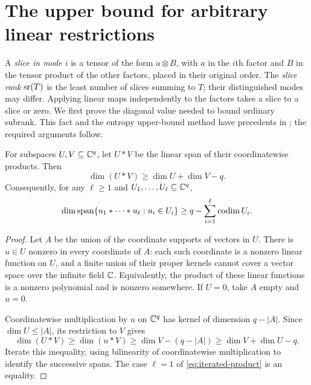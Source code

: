 \section{The upper bound for arbitrary linear restrictions}\label{sec:upper}

A \emph{slice in mode $i$} is a tensor of the form $a\otimes B$,
with $a$ in the $i$th factor and $B$ in the tensor product of the other
factors, placed in their original order. The \emph{slice rank} $\operatorname{sr}(T)$
is the least number of slices summing to $T$; their distinguished modes
may differ. Applying linear maps independently to the factors takes
a slice to a slice or zero. We first prove the diagonal value needed
to bound ordinary subrank. This fact and the entropy upper-bound method
have precedents in \citet{TaoSawin2016}; the required arguments follow.

\begin{lemma}\label{lem:product-dimension}
For subspaces $U,V\subseteq\mathbb C^q$, let $U*V$ be the linear span of
their coordinatewise products. Then
\begin{equation}\label{eq:product-dimension}
 \dim(U*V)\geq\dim U+\dim V-q.
\end{equation}
Consequently, for any $\ell\geq1$ and $U_1,\ldots,U_\ell\subseteq\mathbb C^q$,
\begin{equation}\label{eq:iterated-product}
 \dim\operatorname{span}\{u_1*\cdots*u_\ell:u_i\in U_i\}
    \geq q-\sum_{i=1}^{\ell}\operatorname{codim} U_i.
\end{equation}
\end{lemma}
\begin{proof}
Let $A$ be the union of the coordinate supports of vectors in $U$.
There is $u\in U$ nonzero in every coordinate of $A$: each such
coordinate is a nonzero linear function on $U$, and a finite union of
their proper kernels cannot cover a vector space over the infinite
field $\mathbb C$. Equivalently, the product of these linear functions is
a nonzero polynomial and is nonzero somewhere. If $U=0$, take $A$
empty and $u=0$.

Coordinatewise multiplication by $u$ on $\mathbb C^q$ has kernel of dimension
$q-|A|$. Since $\dim U\leq|A|$, its restriction to $V$ gives
\[
 \dim(U*V)\geq\dim(u*V)
     \geq\dim V-(q-|A|)\geq\dim V+\dim U-q.
\]
Iterate this inequality, using bilinearity of coordinatewise
multiplication to identify the successive spans. The case $\ell=1$
of \eqref{eq:iterated-product} is an equality.
\end{proof}

